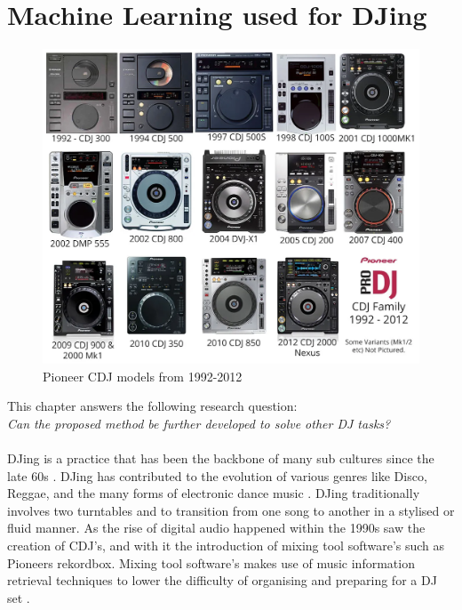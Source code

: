 
\graphicspath{{Chapter3/}}

\chapter{Machine Learning used for DJing}

\begin{figure}[H]
	\includegraphics[scale=0.3]{images/pioneers_history}
	\centering
	\caption{Pioneer CDJ models from 1992-2012 \citep{chesters_history_2017}} 
\end{figure}

This chapter answers the following research question:
\\

\textit{Can the proposed method be further developed to solve other DJ tasks?} 
\\
\\
DJing is a practice that has been the backbone of many sub cultures since the late 60s \citep{brewster_last_2014}. DJing has contributed to the evolution of various genres like Disco, Reggae, and the many forms of electronic dance music \citep{partridge_dub_2010} \citep{reynolds_energy_2013}. DJing traditionally involves two turntables and to transition from one song to another in a stylised or fluid manner. As the rise of digital audio happened within the 1990s saw the creation of CDJ's, and with it the introduction of mixing tool software's such as Pioneers rekordbox. Mixing tool software's makes use of music information retrieval techniques to lower the difficulty of organising and preparing for a DJ set \citep{kim_automatic_2017}. 

